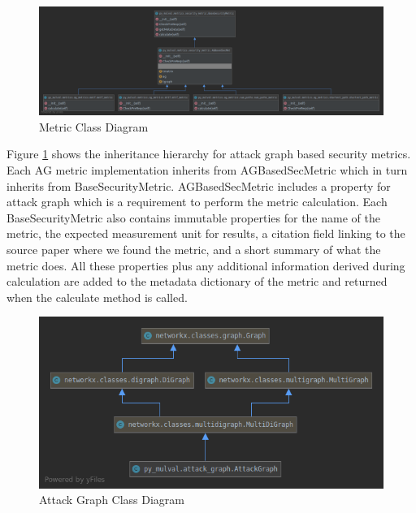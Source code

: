 
 
\begin{figure}[H]
\centering
\includegraphics[width=.95\linewidth]{resource/img/ch_automation/metrics_class_uml.png}
\caption{Metric Class Diagram}
\label{fig:automation:metric_uml}
\end{figure} 

Figure \ref{fig:automation:metric_uml} shows the inheritance hierarchy for attack graph based security metrics. Each AG metric implementation inherits from AGBasedSecMetric which in turn inherits from BaseSecurityMetric. AGBasedSecMetric includes a property for attack graph which is a requirement to perform the metric calculation. Each BaseSecurityMetric also contains immutable properties for the name of the metric, the expected measurement unit for results, a citation field linking to the source paper where we found the metric, and a short summary of what the metric does. All these properties plus any additional information derived during calculation are added to the metadata dictionary of the metric and returned when the calculate method is called. 


\begin{figure}[H]
\centering
\includegraphics[width=.95\linewidth]{resource/img/ch_automation/attack_graph_simple_uml.png}
\caption{Attack Graph Class Diagram}
\label{fig:automation:ag_uml}
\end{figure} 

